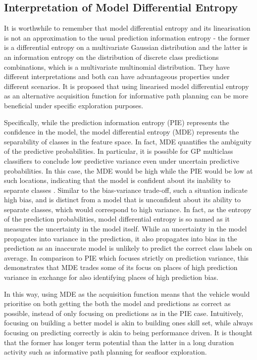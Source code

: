 		\subsection{Interpretation of Model Differential Entropy}
		\label{InformativeSeafloorExploration:ComparisonMutualEntropyMeasures:InterpretationMDE}
		
			It is worthwhile to remember that model differential entropy and its linearisation is not an approximation to the usual prediction information entropy - the former is a differential entropy on a multivariate Gaussian distribution and the latter is an information entropy on the distribution of discrete class predictions combinations, which is a multivariate multinomial distribution. They have different interpretations and both can have advantageous properties under different scenarios. It is proposed that using linearised model differential entropy as an alternative acquisition function for informative path planning can be more beneficial under specific exploration purposes.
			
			Specifically, while the prediction information entropy (PIE) represents the confidence in the model, the model differential entropy (MDE) represents the separability of classes in the feature space. In fact, MDE quantifies the ambiguity of the predictive probabilities. In particular, it is possible for GP multiclass classifiers to conclude low predictive variance even under uncertain predictive probabilities. In this case, the MDE would be high while the PIE would be low at such locations, indicating that the model is confident about its inability to separate classes \citep{AsherBender}. Similar to the bias-variance trade-off, such a situation indicate high bias, and is distinct from a model that is unconfident about its ability to separate classes, which would correspond to high variance. In fact, as the entropy of the prediction probabilities, model differential entropy is so named as it measures the uncertainty in the model itself. While an uncertainty in the model propagates into variance in the prediction, it also propagates into bias in the prediction as an inaccurate model is unlikely to predict the correct class labels on average. In comparison to PIE which focuses strictly on prediction variance, this demonstrates that MDE trades some of its focus on places of high prediction variance in exchange for also identifying places of high prediction bias. 
			
			In this way, using MDE as the acquisition function means that the vehicle would prioritise on both getting the both the model and predictions as correct as possible, instead of only focusing on predictions as in the PIE case. Intuitively, focusing on building a better model is akin to building ones skill set, while always focusing on predicting correctly is akin to being performance driven. It is thought that the former has longer term potential than the latter in a long duration activity such as informative path planning for seafloor exploration.
			
